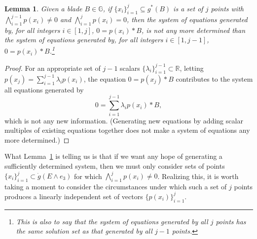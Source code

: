 \documentclass{birkjour}
\newtheorem{lem}[thm]{Lemma}
\theoremstyle{definition}
\theoremstyle{remark}
\numberwithin{equation}{section}
\newcommand{\R}{\mathbb{R}}
\newcommand{\G}{\mathbb{G}}
\newcommand{\gd}{\dot{g}}
\begin{document}
\begin{lem}\label{lma_determine_system}
Given a blade $B\in\G$, if $\{x_i\}_{i=1}^j\subseteq g^*(B)$ is a
set of $j$ points with $\bigwedge_{i=1}^{j-1} p(x_i)\neq 0$ and $\bigwedge_{i=1}^j p(x_i)=0$,
then the system of equations generated by, for all integers $i\in[1,j]$, $0=p(x_i)* B$,
is not any more determined than the system of equations generated by,
for all integers $i\in[1,j-1]$, $0=p(x_i)* B$.\footnote{This is
also to say that the system of equations generated by all $j$ points has the same solution
set as that generated by all $j-1$ points.}
\end{lem}
\begin{proof}
For an appropriate set of $j-1$ scalars $\{\lambda_i\}_{i=1}^{j-1}\subset\R$, letting $p(x_j)=\sum_{i=1}^{j-1}\lambda_i p(x_i)$,
the equation $0=p(x_j)* B$ contributes to the system all equations generated by
\begin{equation*}
0 = \sum_{i=1}^{j-1}\lambda_ip(x_i)* B,
\end{equation*}
which is not any new information.  (Generating new equations by adding scalar multiples of existing equations
together does not make a system of equations any more determined.)
\end{proof}
What Lemma~\ref{lma_determine_system} is telling us is that if we want any hope of generating a sufficiently determined
system, then we must only consider sets of points $\{x_i\}_{i=1}^j\subset\gd(E\wedge e_3)$
for which $\bigwedge_{i=1}^j p(x_i)\neq 0$.  Realizing this, it is worth taking a moment to
consider the circumstances under which such a set of $j$ points produces a linearly
independent set of vectors $\{p(x_i)\}_{i=1}^j$.
\end{document}

